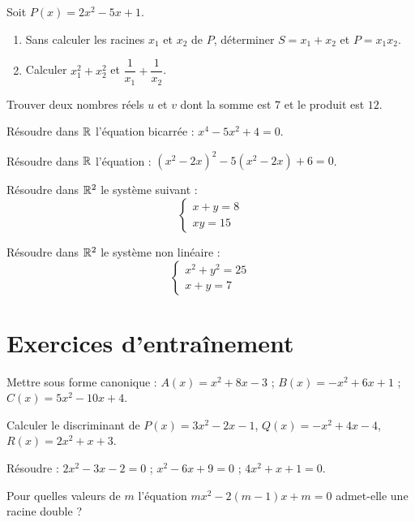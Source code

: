 
\exo{}
Soit $P(x) = 2x^2 - 5x + 1$.
\begin{enumerate}[label=\alph*)]
  \item Sans calculer les racines $x_1$ et $x_2$ de $P$, déterminer $S = x_1 + x_2$ et $P = x_1 x_2$.
  \item Calculer $x_1^2 + x_2^2$ et $\dfrac{1}{x_1} + \dfrac{1}{x_2}$.
\end{enumerate}

\exo{}
Trouver deux nombres réels $u$ et $v$ dont la somme est $7$ et le produit est $12$.


\exo{}
Résoudre dans $\mathbb{R}$ l'équation bicarrée : $x^4 - 5x^2 + 4 = 0$.

\exo{}
Résoudre dans $\mathbb{R}$ l'équation : $(x^2 - 2x)^2 - 5(x^2 - 2x) + 6 = 0$.


\exo{}
Résoudre dans $\mathbb{R}^2$ le système suivant :
\[
\begin{cases}
x + y = 8 \\
xy = 15
\end{cases}
\]

\exo{}
Résoudre dans $\mathbb{R}^2$ le système non linéaire :
\[
\begin{cases}
x^2 + y^2 = 25 \\
x + y = 7
\end{cases}
\]

\section{Exercices d'entraînement}


\exo{}
Mettre sous forme canonique : $A(x) = x^2 + 8x - 3$ ; $B(x) = -x^2 + 6x + 1$ ; $C(x) = 5x^2 - 10x + 4$.

\exo{}
Calculer le discriminant de $P(x) = 3x^2 - 2x - 1$, $Q(x) = -x^2 + 4x - 4$, $R(x) = 2x^2 + x + 3$.

\exo{}
Résoudre : $2x^2 - 3x - 2 = 0$ ; $x^2 - 6x + 9 = 0$ ; $4x^2 + x + 1 = 0$.

\exo{}
Pour quelles valeurs de $m$ l'équation $mx^2 - 2(m-1)x + m = 0$ admet-elle une racine double ?


